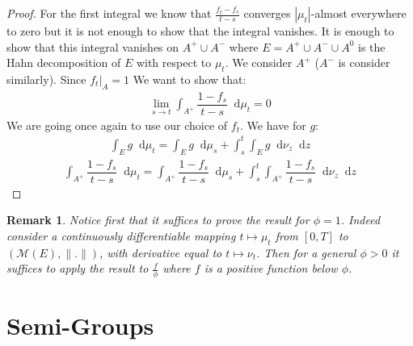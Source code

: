 \documentclass[11pt,a4paper]{article}
\newcommand{\MC}{\mathcal{M}}
\newcommand{\dd}{\mathop{}\!\mathrm{d}}
\newtheorem{remark}[theorem]{Remark}
\begin{document}
\begin{proof}
    For the first integral we know that $\frac{f_{t}-f_s}{t-s}$ converges $|\mu_t|$-almost everywhere to zero but it is not enough to show that the integral vanishes. It is enough to show that this integral vanishes on $A^+\cup A^-$ where $E = A^+ \cup A^- \cup A^0$ is the Hahn decomposition of $E$ with respect to $\mu_t$. We consider $A^+$ ($A^-$ is consider similarly). Since $f_t|_A = 1$ We want to show that:
    \begin{align*}
        \lim\limits_{s\to t}\int_{A^+} \dfrac{1-f_s}{t-s}\dd\mu_{t } = 0
    \end{align*}
    We are going once again to use our choice of $f_t$. We have for $g$:
    \begin{align*}
        \int_E g \dd\mu_t = \int_E g\dd \mu_s + \int_s^t \int_Eg \dd\nu_z \dd z
    \end{align*}
    \begin{align*}
        \int_{A^+} \dfrac{1-f_s}{t-s}\dd\mu_{t }  = \int_{A^+}\dfrac{1-f_s}{t-s}\dd\mu_{s} + \int_s^t \int_{A^+}\dfrac{1-f_s}{t-s}\dd\nu_{z} \dd z
    \end{align*}
    \end{proof}
\begin{remark}
    Notice first that it suffices to prove the result for $\phi = 1$. Indeed consider a continuously differentiable mapping $t\mapsto \mu_t$ from $[0,T]$ to \(\left(\MC(E),\|.\|\right)\), with derivative equal to $t \mapsto\nu_t$. Then for a general $\phi > 0$ it suffices to apply the result to $\frac{f}{\phi}$ where $f$ is a positive function below $\phi$.
\end{remark}

\section{Semi-Groups}\label{section:semigroups}
\end{document}
